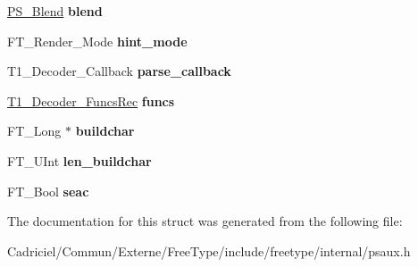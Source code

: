 \begin{DoxyCompactItemize}
\item 
\hyperlink{struct_p_s___blend_rec__}{P\+S\+\_\+\+Blend} {\bfseries blend}\hypertarget{struct_t1___decoder_rec___a0cd698c7041cb4f319949b62f215f7c7}{}\label{struct_t1___decoder_rec___a0cd698c7041cb4f319949b62f215f7c7}

\item 
F\+T\+\_\+\+Render\+\_\+\+Mode {\bfseries hint\+\_\+mode}\hypertarget{struct_t1___decoder_rec___a364b15149edb573dcc79be015eba61b4}{}\label{struct_t1___decoder_rec___a364b15149edb573dcc79be015eba61b4}

\item 
T1\+\_\+\+Decoder\+\_\+\+Callback {\bfseries parse\+\_\+callback}\hypertarget{struct_t1___decoder_rec___a840af0b01e7adb1e3aa521a936196b62}{}\label{struct_t1___decoder_rec___a840af0b01e7adb1e3aa521a936196b62}

\item 
\hyperlink{struct_t1___decoder___funcs_rec__}{T1\+\_\+\+Decoder\+\_\+\+Funcs\+Rec} {\bfseries funcs}\hypertarget{struct_t1___decoder_rec___a6b0f5f7cb3f44e88880aa9c927d79775}{}\label{struct_t1___decoder_rec___a6b0f5f7cb3f44e88880aa9c927d79775}

\item 
F\+T\+\_\+\+Long $\ast$ {\bfseries buildchar}\hypertarget{struct_t1___decoder_rec___a967ee06cbbdc8823be8f95df5db625b9}{}\label{struct_t1___decoder_rec___a967ee06cbbdc8823be8f95df5db625b9}

\item 
F\+T\+\_\+\+U\+Int {\bfseries len\+\_\+buildchar}\hypertarget{struct_t1___decoder_rec___a55fd1c88d6f7badaec2aa13db17c816f}{}\label{struct_t1___decoder_rec___a55fd1c88d6f7badaec2aa13db17c816f}

\item 
F\+T\+\_\+\+Bool {\bfseries seac}\hypertarget{struct_t1___decoder_rec___a45bf18b54ff973177ea3061ef0b705c6}{}\label{struct_t1___decoder_rec___a45bf18b54ff973177ea3061ef0b705c6}

\end{DoxyCompactItemize}


The documentation for this struct was generated from the following file\+:\begin{DoxyCompactItemize}
\item 
Cadriciel/\+Commun/\+Externe/\+Free\+Type/include/freetype/internal/psaux.\+h\end{DoxyCompactItemize}
